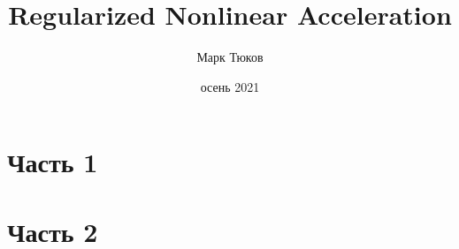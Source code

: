 \documentclass[12pt]{article}
\title{Regularized Nonlinear Acceleration}
\date{осень 2021}
\author{Марк Тюков}
\begin{document}
\maketitle

\tableofcontents

\newpage

\section{Часть 1}
\section{Часть 2}
\end{document}
